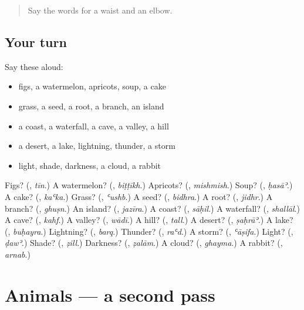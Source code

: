 \label{lesson:AR-R139-first-pass-nature}



\begin{quote}
Say the words for a waist and an elbow.
\end{quote}

\subsection*{Your turn}
Say these aloud:

\begin{itemize}
\raggedright
  \item figs, a watermelon, apricots, soup, a cake
  \item grass, a seed, a root, a branch, an island
  \item a coast, a waterfall, a cave, a valley, a hill
  \item a desert, a lake, lightning, thunder, a storm
  \item light, shade, darkness, a cloud, a rabbit
\end{itemize}

\begin{tcolorbox}[breakable,colback=teal!4,colframe=teal!35!black,title={Before you move on}]
Figs? (\textbf{}, \emph{tīn}.) A watermelon? (\textbf{}, \emph{biṭṭīkh}.) Apricots? (\textbf{}, \emph{mishmish}.) Soup? (\textbf{}, \emph{ḥasāʾ}.) A cake? (\textbf{}, \emph{kaʿka}.) Grass? (\textbf{}, \emph{ʿushb}.) A seed? (\textbf{}, \emph{bidhra}.) A root? (\textbf{}, \emph{jidhr}.) A branch? (\textbf{}, \emph{ghuṣn}.) An island? (\textbf{}, \emph{jazīra}.) A coast? (\textbf{}, \emph{sāḥil}.) A waterfall? (\textbf{}, \emph{shallāl}.) A cave? (\textbf{}, \emph{kahf}.) A valley? (\textbf{}, \emph{wādī}.) A hill? (\textbf{}, \emph{tall}.) A desert? (\textbf{}, \emph{ṣaḥrāʾ}.) A lake? (\textbf{}, \emph{buḥayra}.) Lightning? (\textbf{}, \emph{barq}.) Thunder? (\textbf{}, \emph{raʿd}.) A storm? (\textbf{}, \emph{ʿāṣifa}.) Light? (\textbf{}, \emph{ḍawʾ}.) Shade? (\textbf{}, \emph{ẓill}.) Darkness? (\textbf{}, \emph{ẓalām}.) A cloud? (\textbf{}, \emph{ghayma}.) A rabbit? (\textbf{}, \emph{arnab}.)
\end{tcolorbox}
\section[(dialogue)]{Animals — a second pass}

